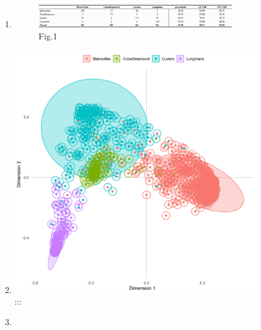 \documentclass[
  letterpaper,
  DIV=11,
  numbers=noendperiod]{scrartcl}
\begin{document}
\begin{figure}

\begin{minipage}[t]{\linewidth}

{\centering 

\begin{enumerate}
\def\labelenumi{\alph{enumi})}
\item
  \begin{figure}

  {\centering \includegraphics{../hawaii/banter_model_hawaii_confuseMatrix.png}

  }

  \caption{\label{fig-a}Fig.1}

  \end{figure}
\item
  \includegraphics{../hawaii/banter_model_hawaii_proximity.png} :::
\item
  \begin{figure}


\end{figure}
\end{enumerate}}
\end{minipage}
\end{figure}
\end{document}
